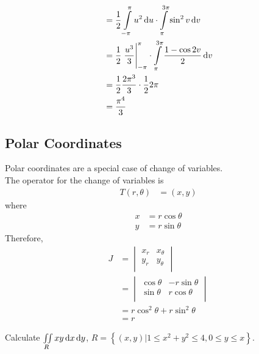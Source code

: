 \documentclass[fleqn, a4paper, 8pt, twoside]{amsart}
\theoremstyle{definition}
\theoremstyle{bluedefinition}
\theoremstyle{redtheorem}
\begin{document}
\begin{multicols}{2}
\begin{spacing}{0.7}
\begin{solution}
\begin{align*}
                                                                                   & = \frac{1}{2} \int\limits_{-\pi}^{\pi} u^2 \dif u \cdot \int\limits_{\pi}^{3 \pi} \sin^2 v \dif v                     \\
                                                                                   & = \frac{1}{2} \left. \frac{u^3}{3} \right|_{-\pi}^{\pi} \cdot \int\limits_{\pi}^{3 \pi} \frac{1 - \cos 2 v}{2} \dif v \\
                                                                                   & = \frac{1}{2} \frac{2 \pi^3}{3} \cdot \frac{1}{2} 2 \pi                                                               \\
                                                                                   & = \frac{\pi^4}{3}
	\end{align*}
\end{solution}

\subsection{Polar Coordinates}

Polar coordinates are a special case of change of variables.\\
The operator for the change of variables is
\begin{align*}
	T(r,\theta) & = (x,y)
\end{align*}
where
\begin{align*}
	x & = r \cos \theta \\
	y & = r \sin \theta
\end{align*}
Therefore,
\begin{align*}
	J &=
		\begin{vmatrix}
			x_r & x_{\theta} \\
			y_r & y_{\theta} \\
		\end{vmatrix}\\
	  &=
		\begin{vmatrix}
			\cos \theta & -r \sin \theta \\
			\sin \theta & r \cos \theta  \\
		\end{vmatrix}\\
	  &= r \cos^2 \theta + r \sin^2 \theta\\
	  &= r
\end{align*}

\begin{question}
	Calculate $\iint\limits_{R} x y \dif x \dif y$, $R = \left\{ (x,y) | 1 \le x^2 + y^2 \le 4 , 0 \le y \le x \right\}$.
\end{question}


\end{spacing}
\end{multicols}
\end{document}
